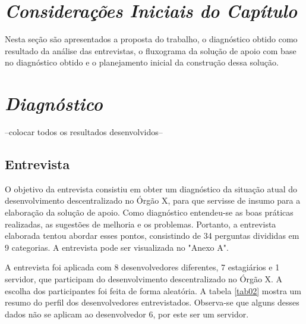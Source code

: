 \section{\textit{Considerações Iniciais do Capítulo}}

Nesta seção são apresentados a proposta do trabalho, o diagnóstico obtido como resultado da análise das entrevistas, o fluxograma da solução de apoio com base no diagnóstico obtido e o planejamento inicial da construção dessa solução.

\section{\textit{Diagnóstico}}

--colocar todos os resultados desenvolvidos--

\subsection{Entrevista}

O objetivo da entrevista consistiu em obter um diagnóstico da situação atual do desenvolvimento descentralizado no Órgão X, para que servisse de insumo para a elaboração da solução de apoio. Como diagnóstico entendeu-se as boas práticas realizadas, as sugestões de melhoria e os problemas. Portanto, a entrevista elaborada tentou abordar esses pontos, consistindo de 34 perguntas divididas em 9 categorias. A entrevista pode ser visualizada no "Anexo A".

A entrevista foi aplicada com 8 desenvolvedores diferentes, 7 estagiários e 1 servidor, que participam do desenvolvimento descentralizado no Órgão X. A escolha dos participantes foi feita de forma aleatória. A tabela \ref{tab02} mostra um resumo do perfil dos desenvolvedores entrevistados. Observa-se que alguns desses dados não se aplicam ao desenvolvedor 6, por este ser um servidor.\newline


